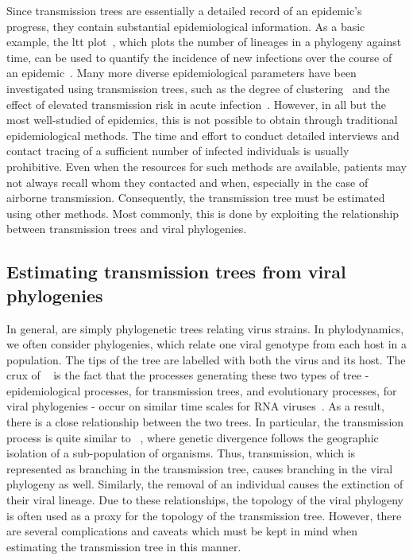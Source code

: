 Since transmission trees are essentially a detailed record of an epidemic's
progress, they contain substantial epidemiological information. As a basic
example, the \gls{ltt} plot~\autocite{nee1992tempo}, which plots the number of
lineages in a phylogeny against time, can be used to quantify the incidence of
new infections over the course of an epidemic~\autocite{holmes1995revealing}.
Many more diverse epidemiological parameters have been investigated using
transmission trees, such as the degree of
clustering~\autocite{hughes2009molecular} and the effect of elevated
transmission risk in acute infection~\autocite{volz2012simple}. However, in all
but the most well-studied of epidemics, this is not possible to obtain through
traditional epidemiological methods. The time and effort to conduct detailed
interviews and contact tracing of a sufficient number of infected individuals
is usually prohibitive. Even when the resources for such methods are available,
patients may not always recall whom they contacted and when, especially in the
case of airborne transmission. Consequently, the transmission tree must be
estimated using other methods. Most commonly, this is done by exploiting the
relationship between transmission trees and viral phylogenies.

\subsection{Estimating transmission trees from viral phylogenies}

In general,  are simply phylogenetic trees relating
virus strains.  In phylodynamics, we
often consider  phylogenies, which relate one viral genotype
from each host in a population. The tips of the tree are labelled with both the
virus and its host. The crux of
~\autocite{grenfell2004unifying} is the fact that the
processes generating these two types of tree - epidemiological processes, for
transmission trees, and evolutionary processes, for viral phylogenies - occur
on similar time scales for RNA viruses~\autocite{drummond2003measurably}. As a
result, there is a close relationship between the two trees. In particular, the
transmission process is quite similar to ~\autocite{coyne2004speciation}, where genetic divergence follows
the geographic isolation of a sub-population of organisms. Thus, transmission,
which is represented as branching in the transmission tree, causes branching in
the viral phylogeny as well. Similarly, the removal of an individual causes the
extinction of their viral lineage. Due to these relationships, the topology of
the viral phylogeny is often used as a proxy for the topology of the
transmission tree. However, there are several complications and caveats which
must be kept in mind when estimating the transmission tree in this manner.

